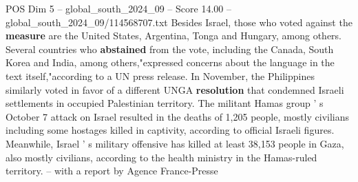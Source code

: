 \begin{textsample}{POS Dim 5 – global\_south\_2024\_09 – Score 14.00 – global\_south\_2024\_09/114568707.txt}
Besides Israel, those who voted against the \textbf{measure} are the United States, Argentina, Tonga and Hungary, among others.
Several countries who \textbf{abstained} from the vote, including the Canada, South Korea and India, among others,"expressed concerns about the language in the text itself,"according to a UN press release.
In November, the Philippines similarly voted in favor of a different UNGA \textbf{resolution} that condemned Israeli settlements in occupied Palestinian territory.
The militant Hamas group ' s October 7 attack on Israel resulted in the deaths of 1,205 people, mostly civilians including some hostages killed in captivity, according to official Israeli figures.
Meanwhile, Israel ' s military offensive has killed at least 38,153 people in Gaza, also mostly civilians, according to the health ministry in the Hamas-ruled territory. -- with a report by Agence France-Presse

\end{textsample}
